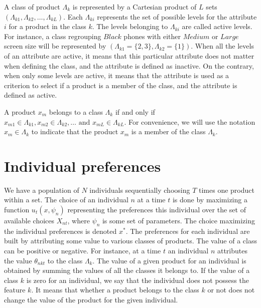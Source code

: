 \documentclass[12pt]{article}
\begin{document}
A class of product $\Lambda_k$ is represented by a Cartesian product of $L$ sets $(\Lambda_{k1},\Lambda_{k2},\ldots,\Lambda_{kL})$. Each $\Lambda_{ki}$ represents the set of possible levels for the attribute $i$ for a product in the class $k$. The levels belonging to $\Lambda_{ki}$ are called active levels. For instance, a class regrouping $Black$ phones with either $Medium \text{ or } Large$ screen size will be represented by $(\Lambda_{k1}=\{2,3\},\Lambda_{k2}=\{1\})$. When all the levels of an attribute are active, it means that this particular attribute does not matter when defining the class, and the attribute is defined as inactive. On the contrary, when only some levels are active, it means that the attribute is used as a criterion to select if a product is a member of the class, and the attribute is defined as active.

A product $x_m$ belongs to a class $\Lambda_k$ if and only if $ x_{m1} \in \Lambda_{k1},x_{m2} \in \Lambda_{k2},\ldots \text{ and } x_{mL} \in \Lambda_{kL}$. For convenience, we will use the notation $x_{m} \in \Lambda_{k}$ to indicate that the product $x_{m}$ is a member of the class $\Lambda_{k}$.

\section{Individual preferences}

We have a population of $N$ individuals sequentially choosing $T$ times one product within a set. The choice of an individual $n$ at a time $t$ is done by maximizing a function $u_t(x,\psi_n)$ representing the preferences this individual over the set of available choices $X_{nt}$, where $\psi_n$ is some set of parameters. The choice maximizing the individual preferences is denoted $x^*$. The preferences for each individual are built by attributing some value to various classes of products. The value of a class can be positive or negative. For instance, at a time $t$ an individual $n$ attributes the value $\theta_{nkt}$ to the class $\Lambda_k$. The value of a given product for an individual is obtained by summing the values of all the classes it belongs to. If the value of a class $k$ is zero for an individual, we say that the individual does not possess the feature $k$. It means that whether a product belongs to the class $k$ or not does not change the value of the product for the given individual.
\end{document}
